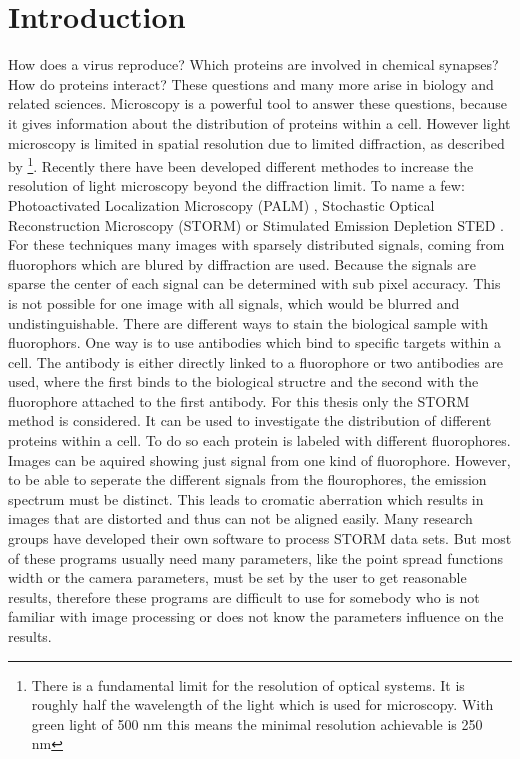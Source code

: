 \chapter{Introduction}
How does a virus reproduce? Which proteins are involved in chemical synapses? How do proteins interact? These questions and many more arise in biology and related sciences. Microscopy is a powerful tool to answer these questions, because it gives information about the distribution of proteins within a cell. However light microscopy is limited in spatial resolution due to limited diffraction, as described by \cite{Abbe} \footnote{There is a fundamental limit for the resolution of optical systems. It is roughly half the wavelength of the light which is used for microscopy. With green light of 500 nm this means the minimal resolution achievable is 250 nm}. Recently there have been developed different methodes to increase the resolution of light microscopy beyond the diffraction limit. To name a few: Photoactivated Localization Microscopy (PALM) \cite{Palm}, Stochastic Optical Reconstruction Microscopy (STORM) \cite{Storm} or Stimulated Emission Depletion STED \cite{sted}. For these techniques many images with sparsely distributed signals, coming from fluorophors which are blured by diffraction are used. Because the signals are sparse the center of each signal can be determined with sub pixel accuracy. This is not possible for one image with all signals, which would be blurred and undistinguishable. There are different ways to stain the biological sample with fluorophors. One way is to use antibodies which bind to specific targets within a cell. The antibody is either directly linked to a fluorophore or two antibodies are used, where the first binds to the biological structre and the second with the fluorophore attached to the first antibody. 
\newline
For this thesis only the STORM method is considered. It can be used to investigate the distribution of different proteins within a cell. To do so each protein is labeled with different fluorophores. Images can be aquired showing just signal from one kind of fluorophore. However, to be able to seperate the different signals from the flourophores, the emission spectrum must be distinct. This leads to cromatic aberration which results in images that are distorted and thus can not be aligned easily.\newline 
Many research groups have developed their own software to process STORM data sets. But most of these programs usually need many parameters, like the point spread functions width or the camera parameters, must be set by the user to get reasonable results, therefore these programs are difficult to use for somebody who is not familiar with image processing or does not know the parameters influence on the results.\newline


